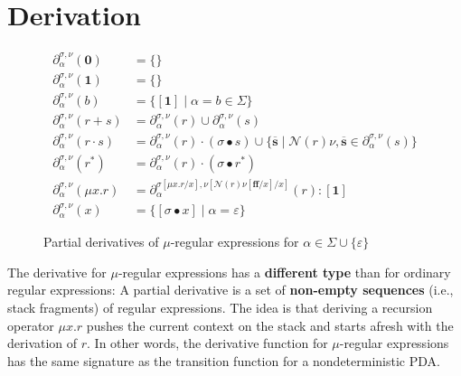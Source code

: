 \documentclass[runningheads, envcountsame, a4paper]{llncs}
\newcommand{\False}{\ensuremath{\mathbf{ff}}}%
\newcommand\CALL{{\textit{call}}}
\newcommand\pderiv[3][{}]{\partial^{#1}_{#3}(#2)}
\newcommand\Rnull{\mathbf0}
\newcommand\Rempty{\mathbf1}
\newcommand\PUSH{:}
\newcommand\SINGLETON[1]{{[#1]}}
\newcommand\Null{\mathcal{N}}
\renewcommand\SS{\ensuremath{\overline{\mathbf{s}}}}
\newcommand\ApplySubst[2]{#1 \bullet #2} %
\begin{document}
\section{Derivation}
\label{sec:derivation-v2}

\begin{figure}[t]
  \begin{align*}
    \pderiv[\sigma,\nu]{\Rnull}{\alpha} &= \{\} \\
    \pderiv[\sigma,\nu]{\Rempty}{\alpha} &= \{\} \\
    \pderiv[\sigma,\nu]{b}{\alpha} &= \{ [\Rempty] \mid \alpha=b \in\Sigma \}    \\
    \pderiv[\sigma,\nu]{r + s}{\alpha} &= \pderiv[\sigma,\nu]{r}{\alpha} \cup \pderiv[\sigma,\nu]{s}{\alpha} \\
    \pderiv[\sigma,\nu]{r \cdot s}{\alpha} &= \pderiv[\sigma,\nu]{r}{\alpha}
                                        \cdot (\ApplySubst\sigma s) \cup \{ \SS \mid \Null
                                    (r)\nu, \SS \in \pderiv[\sigma,\nu]{s}{\alpha} \} \\
    \pderiv[\sigma,\nu]{r^*}{\alpha} &= \pderiv[\sigma,\nu]{r}{\alpha} \cdot
                                  (\ApplySubst\sigma r^*)
    \\
    \pderiv[\sigma,\nu]{\mu x.r}{\alpha}
    &= \pderiv[\sigma{[\mu x.r/x]}, \nu{[\Null(r)\nu[\False/x]/x]}]{r}{\alpha}
      \PUSH \SINGLETON\Rempty
    \\ 
    \pderiv[\sigma,\nu]{x}{\alpha} &= \{ \SINGLETON{\ApplySubst\sigma
                                     x} \mid \alpha=\varepsilon \}
  \end{align*}
  \caption{Partial derivatives of $\mu$-regular expressions for
    $\alpha \in \Sigma \cup \{\varepsilon\}$}
  \label{fig:partial-derivatives-v2}
\end{figure}


The derivative for $\mu$-regular expressions has a
\textbf{different type} than for ordinary regular expressions:
A partial derivative is a set of \textbf{non-empty sequences} (i.e.,
stack fragments) of regular expressions. 
The idea is that deriving a recursion operator $\mu x.r$ pushes the current
context on the stack and starts afresh with the derivation of $r$. In
other words, the derivative function for $\mu$-regular expressions has
the same signature as the transition function for a nondeterministic PDA.
\end{document}
